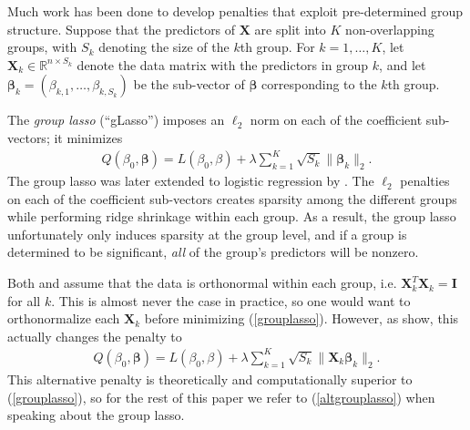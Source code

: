 \documentclass[11pt]{article}
\newcommand{\citeay}[1]{\citeauthor{#1} \citeyear{#1}}
\begin{document}

Much work has been done to develop penalties that exploit pre-determined group structure. Suppose that the predictors of $\mathbf{X}$ are split into $K$ non-overlapping groups, with $S_k$ denoting the size of the $k$th group. For $k = 1, \ldots, K$, let $\mathbf{X}_k \in \mathbb{R}^{n \times S_k}$ denote the data matrix with the predictors in group $k$, and let $\bm{\beta}_k = (\beta_{k,1}, \ldots, \beta_{k, S_k})$ be the sub-vector of $\bm{\beta}$ corresponding to the $k$th group. 

The \textit{group lasso} (``gLasso'') \cite{yuan2006model} imposes an $\ell_2$ norm on each of the coefficient sub-vectors; it minimizes 
\begin{align}
    \label{grouplasso}
    Q(\beta_0, \bm{\beta}) = L(\beta_0, \beta) + \lambda \sum_{k=1}^K \sqrt{S_k} \| \bm{\beta}_k \|_2.
\end{align}
The group lasso was later extended to logistic regression by \citeay{meier2008group}. The $\ell_2$ penalties on each of the coefficient sub-vectors creates sparsity among the different groups while performing ridge shrinkage within each group. %
As a result, the group lasso unfortunately only induces sparsity at the group level, and if a group is determined to be significant, \textit{all} of the group's predictors will be nonzero.

Both \citeay{yuan2006model} and \citeay{meier2008group} assume that the data is orthonormal within each group, i.e. $\mathbf{X}_k^T \mathbf{X}_k = \mathbf{I}$ for all $k$. This is almost never the case in practice, so one would want to orthonormalize each $\mathbf{X}_k$ before minimizing (\ref{grouplasso}). However, as \citeay{simon2012standardization} show, this actually changes the penalty to
\begin{align}
    \label{altgrouplasso}
    Q(\beta_0, \bm{\beta}) = L(\beta_0, \beta) + \lambda \sum_{k=1}^K \sqrt{S_k} \| \mathbf{X}_k \bm{\beta}_k \|_2.
\end{align}
This alternative penalty is theoretically and computationally superior \cite{breheny2015group} to (\ref{grouplasso}), so for the rest of this paper we refer to (\ref{altgrouplasso}) when speaking about the group lasso. 
\end{document}
